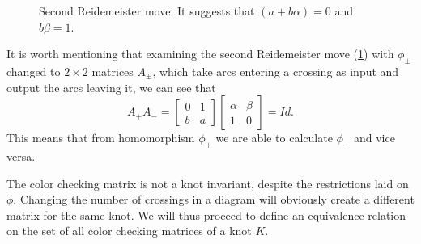 \begin{figure}[h]\centering
  \caption{Second Reidemeister move. It suggests that $(a+b\alpha)=0$ and $b\beta =1$.\label{fig: ograniczanie phi reidemeister}}
\end{figure}

It is worth mentioning that examining the second Reidemeister move (\cref{fig: ograniczanie phi reidemeister}) with $\phi_\pm$ changed to $2\times 2$ matrices $A_\pm$, which take arcs entering a crossing as input and output the arcs leaving it, we can see that 
$$A_+ A_-=\begin{bmatrix}0 & 1\\ b & a\end{bmatrix}\begin{bmatrix}\alpha & \beta \\ 1 & 0\end{bmatrix}=Id.$$
This means that from homomorphism $\phi_+$ we are able to calculate $\phi_-$ and vice versa.

The color checking matrix is not a knot invariant, despite the restrictions laid on $\phi$. Changing the number of crossings in a diagram will obviously create a different matrix for the same knot. We will thus proceed to define an equivalence relation on the set of all color checking matrices of a knot $K$.











